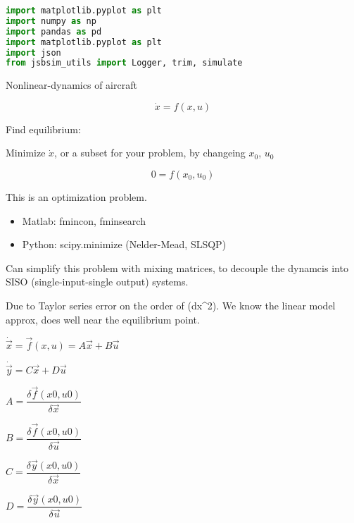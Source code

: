 \begin{lstlisting}[language=Python]
import matplotlib.pyplot as plt
import numpy as np
import pandas as pd
import matplotlib.pyplot as plt
import json 
from jsbsim_utils import Logger, trim, simulate
\end{lstlisting}

Nonlinear-dynamics of aircraft

\[\dot{x} = f(x, u)\]

Find equilibrium:

Minimize \(\dot{x}\), or a subset for your problem, by changeing
\(x_0\), \(u_0\)

\[0 = f(x_0, u_0)\]

This is an optimization problem.

\begin{itemize}
\tightlist
\item
  Matlab: fmincon, fminsearch
\item
  Python: scipy.minimize (Nelder-Mead, SLSQP)
\end{itemize}

Can simplify this problem with mixing matrices, to decouple the dynamcis
into SISO (single-input-single output) systems.

Due to Taylor series error on the order of (dx\^{}2). We know the linear
model approx, does well near the equilibrium point.

\(\dot{\vec{x}} = \vec{f}(x, u) = A \vec{x} + B \vec{u}\)

\(\dot{\vec{y}} = C \vec{x} + D \vec{u}\)

\(A = \dfrac{\delta \vec{f}(x0, u0)}{\delta \vec{x}}\)

\(B = \dfrac{\delta \vec{f}(x0, u0)}{\delta \vec{u}}\)

\(C = \dfrac{\delta \vec{y}(x0, u0)}{\delta \vec{x}}\)

\(D = \dfrac{\delta \vec{y}(x0, u0)}{\delta \vec{u}}\)

